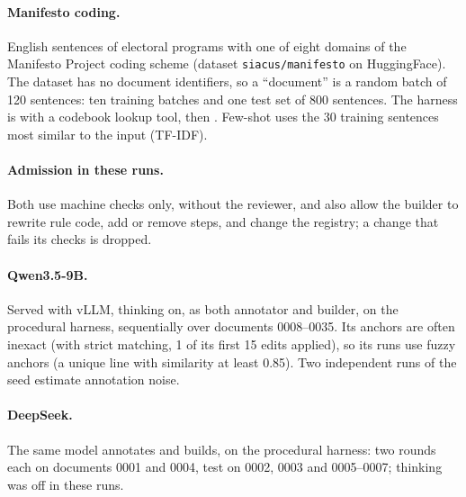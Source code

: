\paragraph{Manifesto coding.} English sentences of electoral programs with one of eight domains of the Manifesto Project coding scheme (dataset \texttt{siacus/manifesto} on HuggingFace). The dataset has no document identifiers, so a ``document'' is a random batch of 120 sentences: ten training batches and one test set of 800 sentences. The harness is  with a codebook lookup tool, then . Few-shot uses the 30 training sentences most similar to the input (TF-IDF).

\paragraph{Admission in these runs.} Both use machine checks only, without the reviewer, and also allow the builder to rewrite rule code, add or remove steps, and change the registry; a change that fails its checks is dropped.

\paragraph{Qwen3.5-9B.} Served with vLLM, thinking on, as both annotator and builder, on the procedural harness, sequentially over documents 0008--0035. Its anchors are often inexact (with strict matching, 1 of its first 15 edits applied), so its runs use fuzzy anchors (a unique line with similarity at least 0.85). Two independent runs of the seed estimate annotation noise.

\paragraph{DeepSeek.} The same model annotates and builds, on the procedural harness: two rounds each on documents 0001 and 0004, test on 0002, 0003 and 0005--0007; thinking was off in these runs.
